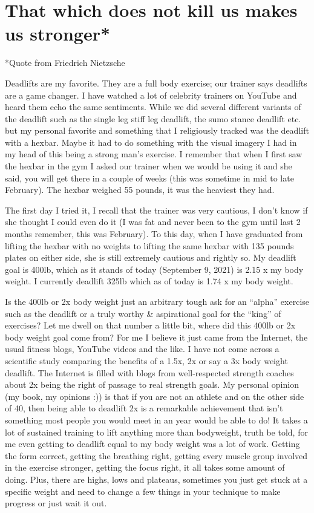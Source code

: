 \documentclass[
  oneside]{book}
\begin{document}
\hypertarget{that-which-does-not-kill-us-makes-us-stronger}{%
\section{That which does not kill us makes us stronger*}\label{that-which-does-not-kill-us-makes-us-stronger}}

*Quote from Friedrich Nietzsche

Deadlifts are my favorite. They are a full body exercise; our trainer says deadlifts are a game changer. I have watched a lot of celebrity trainers on YouTube and heard them echo the same sentiments. While we did several different variants of the deadlift such as the single leg stiff leg deadlift, the sumo stance deadlift etc. but my personal favorite and something that I religiously tracked was the deadlift with a hexbar. Maybe it had to do something with the visual imagery I had in my head of this being a strong man's exercise. I remember that when I first saw the hexbar in the gym I asked our trainer when we would be using it and she said, you will get there in a couple of weeks (this was sometime in mid to late February). The hexbar weighed 55 pounds, it was the heaviest they had.

The first day I tried it, I recall that the trainer was very cautious, I don't know if she thought I could even do it (I was fat and never been to the gym until last 2 months remember, this was February). To this day, when I have graduated from lifting the hexbar with no weights to lifting the same hexbar with 135 pounds plates on either side, she is still extremely cautious and rightly so. My deadlift goal is 400lb, which as it stands of today (September 9, 2021) is 2.15 x my body weight. I currently deadlift 325lb which as of today is 1.74 x my body weight.

Is the 400lb or 2x body weight just an arbitrary tough ask for an ``alpha'' exercise such as the deadlift or a truly worthy \& aspirational goal for the ``king'' of exercises? Let me dwell on that number a little bit, where did this 400lb or 2x body weight goal come from? For me I believe it just came from the Internet, the usual fitness blogs, YouTube videos and the like. I have not come across a scientific study comparing the benefits of a 1.5x, 2x or say a 3x body weight deadlift. The Internet is filled with blogs from well-respected strength coaches about 2x being the right of passage to real strength goals. My personal opinion (my book, my opinions :)) is that if you are not an athlete and on the other side of 40, then being able to deadlift 2x is a remarkable achievement that isn't something most people you would meet in an year would be able to do! It takes a lot of sustained training to lift anything more than bodyweight, truth be told, for me even getting to deadlift equal to my body weight was a lot of work. Getting the form correct, getting the breathing right, getting every muscle group involved in the exercise stronger, getting the focus right, it all takes some amount of doing. Plus, there are highs, lows and plateaus, sometimes you just get stuck at a specific weight and need to change a few things in your technique to make progress or just wait it out.
\end{document}
